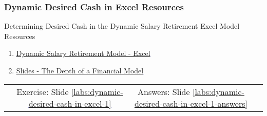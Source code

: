 \documentclass[handout, 11pt]{beamer}
\begin{document}
\begin{frame}
\frametitle{Dynamic Desired Cash in Excel Resources}
{
\begin{block}{Determining Desired Cash in the Dynamic Salary Retirement Excel Model Resources}
\begin{enumerate}
\item \textcolor{blue}{\underline{\href{https://nickderobertis.github.io/fin-model-course/\_static/Examples/Introduction/Excel/Dynamic Salary Retirement Model.xlsx}{Dynamic Salary Retirement Model - Excel}}}
\item \textcolor{blue}{\underline{\href{https://nickderobertis.github.io/fin-model-course/\_static/generated/pdfs/S3 The Depth of a Financial Model.pdf}{Slides - The Depth of a Financial Model}}}
\end{enumerate}
\vfill
\begin{tabular*}{\textwidth}{@{\extracolsep{\fill}}cccc}
\toprule
\hfill & Exercise: Slide \textcolor{blue}{\underline{\ref{labs:dynamic-desired-cash-in-excel-1}}} & Answers: Slide \textcolor{blue}{\underline{\ref{labs:dynamic-desired-cash-in-excel-1-answers}}} & \hfill\\

\end{tabular*}
\end{block}
}
\label{labs:dynamic-desired-cash-in-excel-1-resources}
\end{frame}
\setcounter{framenumber}{\value{finalframe}}
\end{document}
